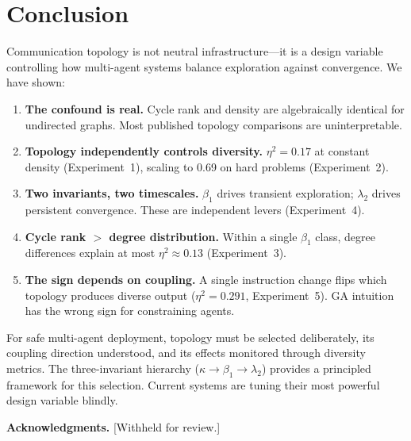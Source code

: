 \documentclass[runningheads]{llncs}
\begin{document}
\section{Conclusion}
\label{sec:conclusion}

Communication topology is not neutral infrastructure---it is a design
variable controlling how multi-agent systems balance exploration
against convergence. We have shown:

\begin{enumerate}[nosep]
  \item \textbf{The confound is real.} Cycle rank and density are
    algebraically identical for undirected graphs. Most published
    topology comparisons are uninterpretable.

  \item \textbf{Topology independently controls diversity.}
    $\eta^2 = 0.17$ at constant density (Experiment~1), scaling to
    0.69 on hard problems (Experiment~2).

  \item \textbf{Two invariants, two timescales.} $\beta_1$ drives
    transient exploration; $\lambda_2$ drives persistent convergence.
    These are independent levers (Experiment~4).

  \item \textbf{Cycle rank $>$ degree distribution.} Within a single
    $\beta_1$ class, degree differences explain at most
    $\eta^2 \approx 0.13$ (Experiment~3).

  \item \textbf{The sign depends on coupling.} A single instruction
    change flips which topology produces diverse output
    ($\eta^2 = 0.291$, Experiment~5). GA intuition has the wrong sign
    for constraining agents.
\end{enumerate}

\noindent
For safe multi-agent deployment, topology must be selected
deliberately, its coupling direction understood, and its effects
monitored through diversity metrics. The three-invariant hierarchy
($\kappa \to \beta_1 \to \lambda_2$) provides a principled framework
for this selection. Current systems are tuning their most powerful
design variable blindly.

\smallskip
\noindent\textbf{Acknowledgments.} [Withheld for review.]

\end{document}
